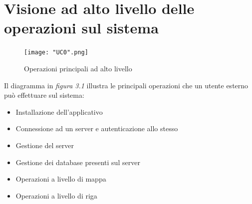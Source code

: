 \documentclass[a4paper]{report}
\begin{document}
		\section{Visione ad alto livello delle operazioni sul sistema}
		 	\begin{figure}[H]
				\centering
				\texttt{[image: "UC0".png]}
				\caption{Operazioni principali ad alto livello}
			\end{figure}
			Il diagramma in \emph{figura 3.1} illustra le principali operazioni che un utente esterno può
			 effettuare sul sistema:
			\begin{itemize}
				\item Installazione dell'applicativo
				\item Connessione ad un server e autenticazione allo stesso
				\item Gestione del server
				\item Gestione dei database presenti sul server
				\item Operazioni a livello di mappa
				\item Operazioni a livello di riga
			\end{itemize}
\end{document}

